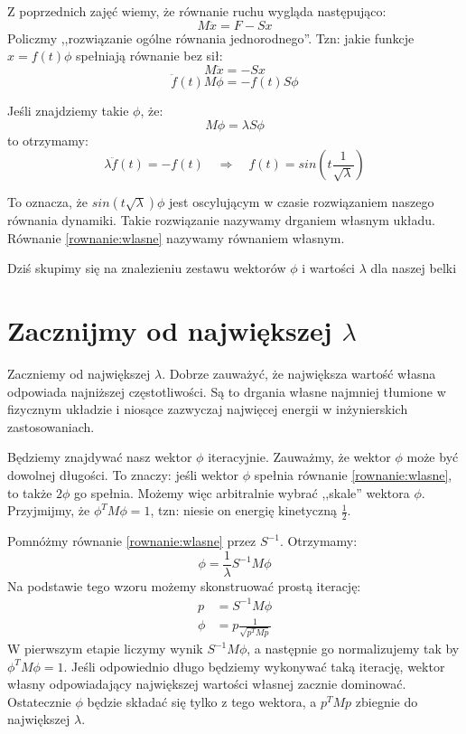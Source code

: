\documentclass{instrukcja}
\begin{document}
\author{Ł. Łaniewski-Wołłk}
\materialtitle

Z poprzednich zajęć wiemy, że równanie ruchu wygląda następująco:
\[M\ddot{x} = F - Sx\]
Policzmy ,,rozwiązanie ogólne równania jednorodnego''. Tzn: jakie funkcje $x=f(t)\phi$ spełniają równanie bez sił:
\[M\ddot{x} = - Sx\]
\[\ddot{f}(t)M\phi = - f(t)S\phi\]

Jeśli znajdziemy takie $\phi$, że:
\begin{equation}\label{rownanie:wlasne}M\phi = \lambda S\phi\end{equation}
to otrzymamy:
\[\lambda\ddot{f}(t) = -  f(t) \quad\Rightarrow\quad f(t) = sin \left(t\frac{1}{\sqrt{\lambda}}\right)\]

To oznacza, że $sin(t\sqrt{\lambda})\phi$ jest oscylującym w czasie rozwiązaniem naszego równania dynamiki. Takie rozwiązanie nazywamy drganiem własnym układu. Równanie \eqref{rownanie:wlasne} nazywamy równaniem własnym.

Dziś skupimy się na znalezieniu zestawu wektorów $\phi$ i wartości $\lambda$ dla naszej belki

\section{Zacznijmy od największej $\lambda$}
Zaczniemy od największej $\lambda$. Dobrze zauważyć, że największa wartość własna odpowiada najniższej częstotliwości. Są to drgania własne najmniej tłumione w fizycznym układzie i niosące zazwyczaj najwięcej energii w inżynierskich zastosowaniach.

Będziemy znajdywać nasz wektor $\phi$ iteracyjnie. Zauważmy, że wektor $\phi$ może być dowolnej długości. To znaczy: jeśli wektor $\phi$ spełnia równanie \eqref{rownanie:wlasne}, to także $2\phi$ go spełnia. Możemy więc arbitralnie wybrać ,,skale'' wektora $\phi$. Przyjmijmy, że $\phi^T M \phi = 1$, tzn: niesie on energię kinetyczną $\frac{1}{2}$.

Pomnóżmy równanie \eqref{rownanie:wlasne} przez $S^{-1}$. Otrzymamy:
\[\phi = \frac{1}{\lambda}S^{-1}M\phi\]
Na podstawie tego wzoru możemy skonstruować prostą iterację:
\begin{align*}
p &= S^{-1}M\phi\\
\phi &= p\frac{1}{\sqrt{p^TMp}}
\end{align*}
W pierwszym etapie liczymy wynik $S^{-1}M\phi$, a następnie go normalizujemy tak by $\phi^T M \phi = 1$. Jeśli odpowiednio długo będziemy wykonywać taką iterację, wektor własny odpowiadający największej wartości własnej zacznie dominować. Ostatecznie $\phi$ będzie składać się tylko z tego wektora, a $p^TMp$ zbiegnie do największej $\lambda$.
\end{document}
